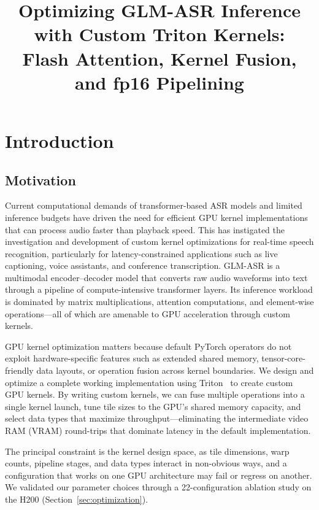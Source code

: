 \documentclass{article}
\title{Optimizing GLM-ASR Inference with Custom Triton Kernels:\\Flash Attention, Kernel Fusion, and fp16 Pipelining}
\begin{document}
\maketitle


\section{Introduction}\label{sec:motivation}

\subsection{Motivation}

Current computational demands of transformer-based ASR models and limited inference budgets have driven the need for efficient GPU kernel implementations that can process audio faster than playback speed.
This has instigated the investigation and development of custom kernel optimizations for real-time speech recognition, particularly for latency-constrained applications such as live captioning, voice assistants, and conference transcription.
GLM-ASR is a multimodal encoder--decoder model that converts raw audio waveforms into text through a pipeline of compute-intensive transformer layers.
Its inference workload is dominated by matrix multiplications, attention computations, and element-wise operations---all of which are amenable to GPU acceleration through custom kernels.

GPU kernel optimization matters because default PyTorch operators do not exploit hardware-specific features such as extended shared memory, tensor-core-friendly data layouts, or operation fusion across kernel boundaries.
We design and optimize a complete working implementation using Triton~\citep{tillet2019triton} to create custom GPU kernels.
By writing custom kernels, we can fuse multiple operations into a single kernel launch, tune tile sizes to the GPU's shared memory capacity, and select data types that maximize throughput---eliminating the intermediate video RAM (VRAM) round-trips that dominate latency in the default implementation.

The principal constraint is the kernel design space, as tile dimensions, warp counts, pipeline stages, and data types interact in non-obvious ways, and a configuration that works on one GPU architecture may fail or regress on another.
We validated our parameter choices through a 22-configuration ablation study on the H200 (Section~\ref{sec:optimization}).
\end{document}
